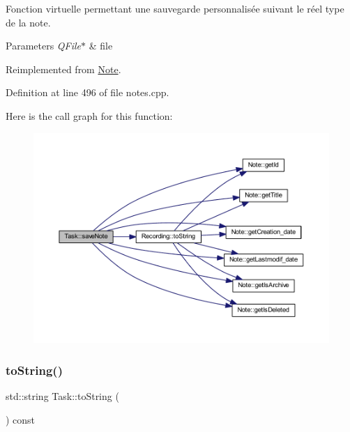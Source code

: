Fonction virtuelle permettant une sauvegarde personnalisée suivant le réel type de la note. 


\begin{DoxyParams}{Parameters}
{\em Q\+File$\ast$} & file \\
\hline
\end{DoxyParams}


Reimplemented from \hyperlink{class_note_a0c2cc72d7f3235c665a30ef915c5c58d}{Note}.



Definition at line 496 of file notes.\+cpp.

Here is the call graph for this function\+:\nopagebreak
\begin{figure}[H]
\begin{center}
\leavevmode
\includegraphics[width=350pt]{class_task_a313eb342d047e8e5cab91bf51609a2f3_cgraph}
\end{center}
\end{figure}
\mbox{\label{class_task_a7fe5cb7b57a21693e7abfea2f9618563}} 
\subsubsection{\texorpdfstring{to\+String()}{toString()}}
{\footnotesize\ttfamily std\+::string Task\+::to\+String (\begin{DoxyParamCaption}{ }\end{DoxyParamCaption}) const\hspace{0.3cm}{\ttfamily [virtual]}}



